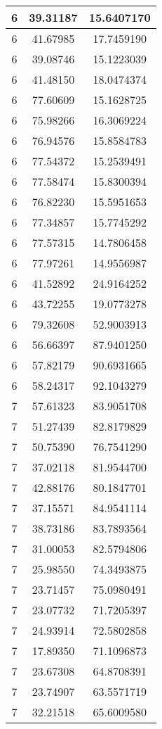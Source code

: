 \documentclass[
]{book}
\begin{document}
\begin{tabular}{c|c|c}
\hline
6 & 39.31187 & 15.6407170\\
\hline
6 & 41.67985 & 17.7459190\\
\hline
6 & 39.08746 & 15.1223039\\
\hline
6 & 41.48150 & 18.0474374\\
\hline
6 & 77.60609 & 15.1628725\\
\hline
6 & 75.98266 & 16.3069224\\
\hline
6 & 76.94576 & 15.8584783\\
\hline
6 & 77.54372 & 15.2539491\\
\hline
6 & 77.58474 & 15.8300394\\
\hline
6 & 76.82230 & 15.5951653\\
\hline
6 & 77.34857 & 15.7745292\\
\hline
6 & 77.57315 & 14.7806458\\
\hline
6 & 77.97261 & 14.9556987\\
\hline
6 & 41.52892 & 24.9164252\\
\hline
6 & 43.72255 & 19.0773278\\
\hline
6 & 79.32608 & 52.9003913\\
\hline
6 & 56.66397 & 87.9401250\\
\hline
6 & 57.82179 & 90.6931665\\
\hline
6 & 58.24317 & 92.1043279\\
\hline
7 & 57.61323 & 83.9051708\\
\hline
7 & 51.27439 & 82.8179829\\
\hline
7 & 50.75390 & 76.7541290\\
\hline
7 & 37.02118 & 81.9544700\\
\hline
7 & 42.88176 & 80.1847701\\
\hline
7 & 37.15571 & 84.9541114\\
\hline
7 & 38.73186 & 83.7893564\\
\hline
7 & 31.00053 & 82.5794806\\
\hline
7 & 25.98550 & 74.3493875\\
\hline
7 & 23.71457 & 75.0980491\\
\hline
7 & 23.07732 & 71.7205397\\
\hline
7 & 24.93914 & 72.5802858\\
\hline
7 & 17.89350 & 71.1096873\\
\hline
7 & 23.67308 & 64.8708391\\
\hline
7 & 23.74907 & 63.5571719\\
\hline
7 & 32.21518 & 65.6009580\\

\end{tabular}
\end{document}
